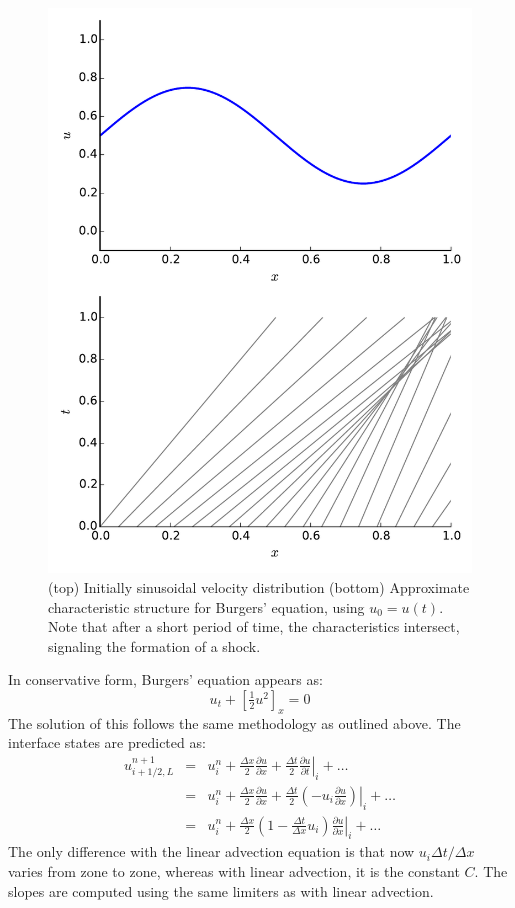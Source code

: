 \begin{figure}[t]
\centering
\includegraphics[width=0.6\linewidth]{burgers-characteristics}
\caption{\label{fig:burgers_char} (top) Initially sinusoidal
velocity distribution (bottom) Approximate characteristic
structure for Burgers' equation, using $u_0 = u(t)$.  Note that
after a short period of time, the characteristics intersect, signaling
the formation of a shock.}
\end{figure}



In conservative form, Burgers' equation appears as:
\begin{equation}
u_t + \left [\tfrac{1}{2} u^2 \right ]_x = 0
\end{equation}
The solution of this follows the same methodology as outlined above.
The interface states are predicted as:
\begin{eqnarray}
u^{n+1}_{i+1/2,L} 
 &=& u^n_i + \frac{\Delta x}{2} \frac{\partial u}{\partial x}
    + \frac{\Delta t}{2} \left . \frac{\partial u}{\partial t} \right |_i
    + \ldots \\
 &=& u^n_i + \frac{\Delta x}{2} \frac{\partial u}{\partial x}
    + \frac{\Delta t}{2} \left . \left (-u_i \frac{\partial u}{\partial x} 
         \right ) \right |_i 
    + \ldots \\
 &=& u^n_i + \frac{\Delta x}{2} 
   \left ( 1 - \frac{\Delta t}{\Delta x} u_i \right ) 
   \left . \frac{\partial u}{\partial x} \right |_i + \ldots
\end{eqnarray}
The only difference with the linear advection equation is that now
$u_i \Delta t/\Delta x$ varies from zone to zone, whereas with linear
advection, it is the constant $C$.  The slopes are computed using
the same limiters as with linear advection.  

